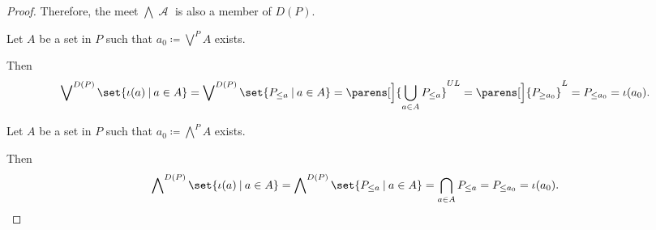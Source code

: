 \begin{proof}
  Therefore, the meet \( \bigwedge \mscrA \) is also a member of \( D(P) \).

   Let \( A \) be a set in \( P \) such that \( a_0 \coloneqq \bigvee^P A \) exists.

  Then
  \begin{equation*}
    \bigvee\nolimits^{D(P)} \set{ \iota(a) \given a \in A }
    =
    \bigvee\nolimits^{D(P)} \set{ P_{\leq a} \given a \in A }
    =
    \parens[\Big]{ \bigcup_{a \in A} P_{\leq a} }^{UL}
    =
    \parens[\Big]{ P_{\geq a_0} }^L
    =
    P_{\leq a_0}
    =
    \iota(a_0).
  \end{equation*}

   Let \( A \) be a set in \( P \) such that \( a_0 \coloneqq \bigwedge^P A \) exists.

  Then
  \begin{equation*}
    \bigwedge\nolimits^{D(P)} \set{ \iota(a) \given a \in A }
    =
    \bigwedge\nolimits^{D(P)} \set{ P_{\leq a} \given a \in A }
    =
    \bigcap_{a \in A} P_{\leq a}
    =
    P_{\leq a_0}
    =
    \iota(a_0).
  \end{equation*}
\end{proof}

